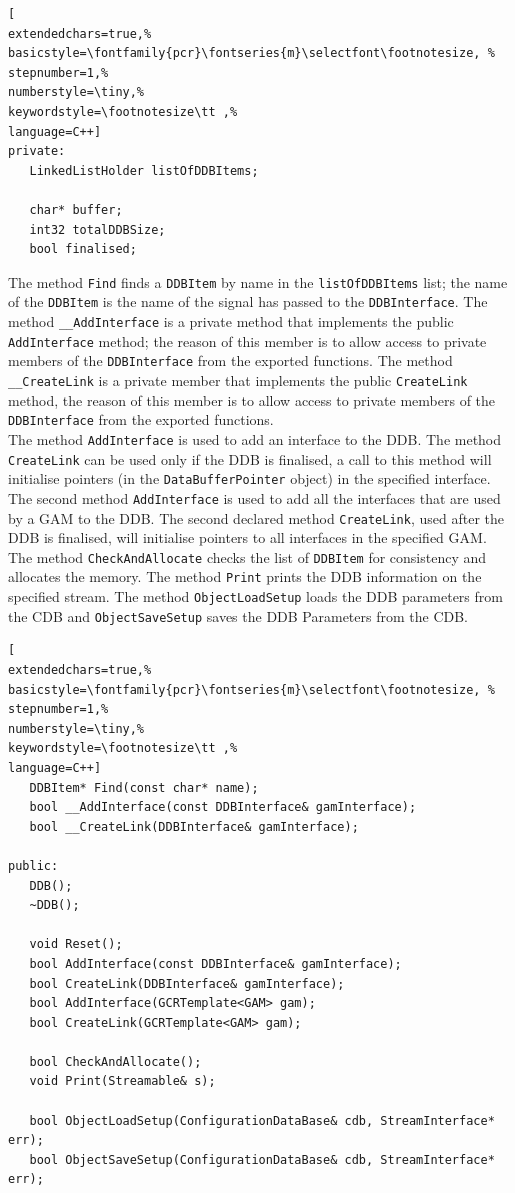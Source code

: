 \begin{lstlisting}[
extendedchars=true,%
basicstyle=\fontfamily{pcr}\fontseries{m}\selectfont\footnotesize, %
stepnumber=1,%
numberstyle=\tiny,%
keywordstyle=\footnotesize\tt ,%
language=C++]
private:
   LinkedListHolder listOfDDBItems;

   char* buffer;
   int32 totalDDBSize;
   bool finalised;
\end{lstlisting}

The method \texttt{Find} finds a \texttt{DDBItem} by name in the \texttt{listOfDDBItems} list; the name of the \texttt{DDBItem} is the name of the signal has passed to the \texttt{DDBInterface}.
The method \texttt{\_\_AddInterface} is a private method that implements the public \texttt{AddInterface} method; the reason of this member is to allow access to private members of the \texttt{DDBInterface} from the exported functions.
The method \texttt{\_\_CreateLink} is a private member that implements the public \texttt{CreateLink} method, the reason of this member is to allow access to private members of the \texttt{DDBInterface} from the exported functions.\\


The method \texttt{AddInterface} is used to add an interface to the DDB. The method \texttt{CreateLink} can be used only if the DDB is finalised, a call to this method will initialise pointers (in the \texttt{DataBufferPointer} object) in the specified interface. The second method \texttt{AddInterface} is used to add all the interfaces that are used by a GAM to the DDB. The second declared method \texttt{CreateLink}, used after the DDB is finalised, will initialise pointers to all interfaces in the specified GAM. \\


The method \texttt{CheckAndAllocate} checks the list of \texttt{DDBItem} for consistency and allocates the memory. The method \texttt{Print} prints the DDB information on the specified stream.
The method \texttt{ObjectLoadSetup} loads the DDB parameters from the CDB and \texttt{ObjectSaveSetup} saves the DDB Parameters from the CDB.

\begin{lstlisting}[
extendedchars=true,%
basicstyle=\fontfamily{pcr}\fontseries{m}\selectfont\footnotesize, %
stepnumber=1,%
numberstyle=\tiny,%
keywordstyle=\footnotesize\tt ,%
language=C++]
   DDBItem* Find(const char* name);
   bool __AddInterface(const DDBInterface& gamInterface);
   bool __CreateLink(DDBInterface& gamInterface);

public:
   DDB();
   ~DDB();

   void Reset();
   bool AddInterface(const DDBInterface& gamInterface);
   bool CreateLink(DDBInterface& gamInterface);
   bool AddInterface(GCRTemplate<GAM> gam);
   bool CreateLink(GCRTemplate<GAM> gam);

   bool CheckAndAllocate();
   void Print(Streamable& s);

   bool ObjectLoadSetup(ConfigurationDataBase& cdb, StreamInterface* err);
   bool ObjectSaveSetup(ConfigurationDataBase& cdb, StreamInterface* err);
\end{lstlisting}



